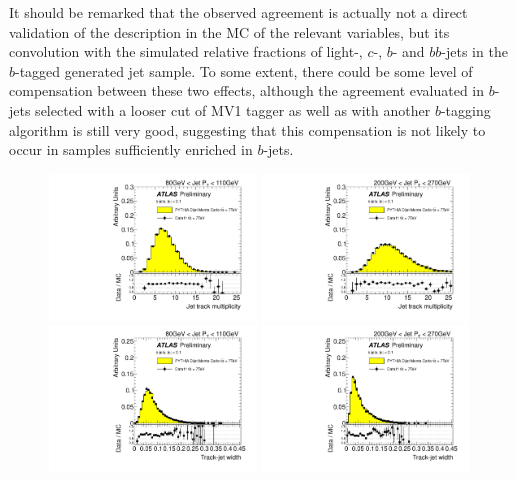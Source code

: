 It should be remarked that the observed agreement is actually not a direct validation of the description in the MC of the relevant variables, but its convolution with the simulated relative fractions of light-, $c$-, $b$- and $bb$-jets in the $b$-tagged generated jet sample. To some extent, there could be some level of compensation between these two effects, although the agreement evaluated in $b$-jets selected with a looser cut of MV1 tagger as well as with another $b$-tagging algorithm is still very good, suggesting that this compensation is not likely to occur in samples sufficiently enriched in $b$-jets.


\begin{figure}[tp]
\centering
\includegraphics[width=0.49\textwidth]{FIGS/dataMC/FullDataVarNtrkPT080.pdf}
\includegraphics[width=0.49\textwidth]{FIGS/dataMC/FullDataVarNtrkPT200.pdf}
\includegraphics[width=0.49\textwidth]{FIGS/dataMC/FullDataVarTrkWidthPT080.pdf}
\includegraphics[width=0.49\textwidth]{FIGS/dataMC/FullDataVarTrkWidthPT200.pdf}  

\end{figure}
